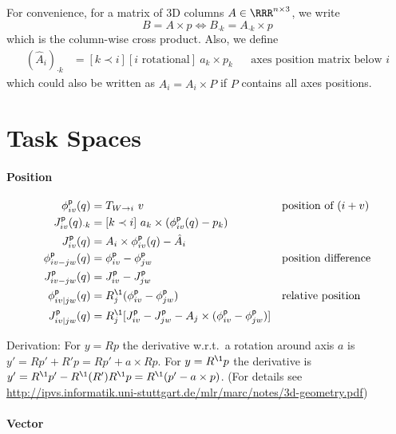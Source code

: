 \documentclass[10pt,fleqn,twoside]{article}
\newcommand{\pos}{{\textsf{p}}}
\newcommand{\TR}[2]{T_{{#1}\rightarrow{#2}}}
\begin{document}
For convenience, for a matrix of 3D columns $A\in\RRR^{n\times 3}$, we write
$$B = A\times p \iff B_{\cdot k} = A_{\cdot k} \times p$$
which is the column-wise cross product. Also, we define
\begin{align}
(\hat A_i)_{\cdot k}
&= [k \prec i] [\text{$i$ rotational}]~ a_k \times p_k && \text{axes
    position matrix below $i$}
\end{align}
which could also be written as $\hat A_i = A_i \times P$ if $P$
contains all axes positions.

\section{Task Spaces}

\paragraph{Position}

\begin{align}
\phi^\pos_{iv}(q)
 &= \TR{W}{i}~ v
 && \text{position of $(i+v)$} \\
J^\pos_{iv}(q)_{\cdot k}
 &= [k\prec i]~ a_k \times(\phi^\pos_{iv}(q) - p_k) \\
J^\pos_{iv}(q)
 &= A_i \times \phi^\pos_{iv}(q) - \hat A_i \\
\phi^\pos_{iv-jw}(q)
 &= \phi^\pos_{iv} - \phi^\pos_{jw}
 && \text{position difference} \\
J^\pos_{iv-jw}(q)
 & = J^\pos_{iv} - J^\pos_{jw} \\
\phi^\pos_{iv|jw}(q)
 & = R_j^\1 (\phi^\pos_{iv} - \phi^\pos_{jw})
 && \text{relative position} \\
J^\pos_{iv|jw}(q)
 & = R_j^\1 [J^\pos_{iv}-J^\pos_{jw} - A_j \times (\phi^\pos_{iv} - \phi^\pos_{jw})]
\end{align}

Derivation: For $y=R p$ the derivative w.r.t.\ a rotation around axis
$a$ is $y' = R p' + R' p = R p' + a \times R p$. For $y=R^\1 p$ the
derivative is $y' = R^\1 p' - R^\1 (R') R^\1 p = R^\1 (p' - a \times
p)$.  (For details see
\url{http://ipvs.informatik.uni-stuttgart.de/mlr/marc/notes/3d-geometry.pdf})

\paragraph{Vector}
\end{document}
